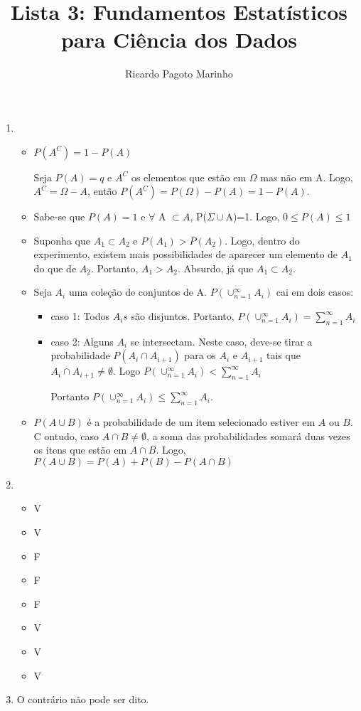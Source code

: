 \documentclass[11pt,a4paper]{book}
\title{Lista 3: Fundamentos Estatísticos para Ciência dos Dados}
\author{Ricardo Pagoto Marinho}
\begin{document}
\maketitle
	\begin{enumerate}
		\item
			\begin{itemize}
				\item
					$P(A^{C})=1-P(A)$
			
					Seja $P(A)= q$ e $A^{C}$ os elementos que estão em $\Omega$ mas não em A.
					Logo, $A^{C}=\Omega-A$, então $P(A^{C})=P(\Omega)-P(A)=1-P(A)$.
			
				\item
					Sabe-se que $P(A)= 1$ e $\forall$ A $\subset A$, P($\Sigma \cup $A)=1.
					Logo, $0 \leq P(A) \leq 1$
				\item
					Suponha que $A_1 \subset A_2$ e $P(A_1) > P(A_2)$.
					Logo, dentro do experimento, existem mais possibilidades de aparecer um elemento de $A_1$ do que de $A_2$.
					Portanto, $A_1>A_2$.
					Absurdo, já que $A_1 \subset A_2$.
				\item
					Seja $A_i$ uma coleção de conjuntos de A.
					$P(\cup_{n=1}^{\infty} A_i)$ cai em dois casos:
					\begin{itemize}
						\item caso 1: Todos $A_is$ são disjuntos.
						Portanto, $P(\cup_{n=1}^{\infty} A_i)= \sum_{n=1}^{\infty} A_i $
						\item caso 2: Alguns $A_i$ se intersectam.
						Neste caso, deve-se tirar a probabilidade $P(A_i \cap A_{i+1}) $ para os $A_i$ e $A_{i+1}$ tais que $A_i \cap A_{i+1} \neq \emptyset$.
						Logo $P(\cup_{n=1}^{\infty} A_i) < \sum_{n=1}^{\infty} A_i $
				
						Portanto $P(\cup_{n=1}^{\infty} A_i)\leq \sum_{n=1}^{\infty} A_i $.
					\end{itemize}
				\item $P(A \cup B)$ é a probabilidade de um item selecionado estiver em $A$ ou $B$.
			C	ontudo, caso $A \cap B \neq \emptyset$, a soma das probabilidades somará duas vezes os itens que estão em $A \cap B$.
				Logo, $P(A \cup B) = P(A) + P(B) - P(A \cap B)$
			\end{itemize}
		\item
			\begin{itemize}
				\item V
				\item V
				\item F
				\item F
				\item F
				\item V
				\item V
				\item V
			\end{itemize}
		\item O contrário não pode ser dito.
		

\end{enumerate}
\end{document}
